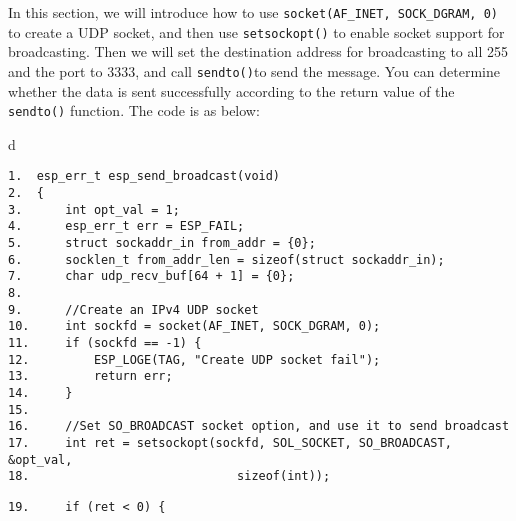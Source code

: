 \documentclass[a4paper,12pt]{book}
\begin{document}
In this section, we will introduce how to use \verb|socket(AF_INET, SOCK_DGRAM, 0)| to create a UDP socket, and then use \verb|setsockopt()| to enable socket support for broadcasting. Then we will set the destination address for broadcasting to all 255 and the port to 3333, and call \verb|sendto()|to send the message. You can determine whether the data is sent successfully according to the return value of the \verb|sendto()| function. The code is as below:

\begin{codebloc}
\begin{tabular}{d}
\vspace{2pt}
\begin{verbatim}
1.  esp_err_t esp_send_broadcast(void)
2.  {
3.      int opt_val = 1;
4.      esp_err_t err = ESP_FAIL;
5.      struct sockaddr_in from_addr = {0};
6.      socklen_t from_addr_len = sizeof(struct sockaddr_in);
7.      char udp_recv_buf[64 + 1] = {0};
8.	
9.      //Create an IPv4 UDP socket
10.     int sockfd = socket(AF_INET, SOCK_DGRAM, 0);
11.     if (sockfd == -1) {
12.         ESP_LOGE(TAG, "Create UDP socket fail");
13.         return err;
14.     }
15.	
16.     //Set SO_BROADCAST socket option, and use it to send broadcast
17.     int ret = setsockopt(sockfd, SOL_SOCKET, SO_BROADCAST, &opt_val,
18.                             sizeof(int));
\end{verbatim}
\verb|19.     if (ret < 0) {|
\end{tabular}
\end{codebloc}
\end{document}
